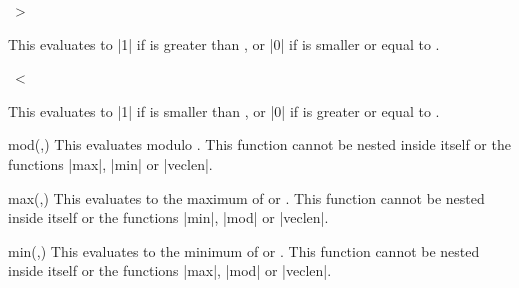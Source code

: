 \begin{math-operator}{\ >\ } 

	This evaluates to |1| if  is greater than , or |0| if 
	 is smaller or equal to .
	
\begin{codeexample}[post=\tt\footnotesize\pgfmathresult]
\end{codeexample}

\end{math-operator}

\begin{math-operator}{\ <\ }

	This evaluates to |1| if  is smaller than , or |0| if
	 is greater or equal to .
	
\begin{codeexample}[post=\tt\footnotesize\pgfmathresult]
\end{codeexample}

\end{math-operator}

\begin{math-function}{mod(,)}
	This evaluates  modulo . This function cannot be 
	nested inside itself or the functions |max|, |min| or |veclen|.

\begin{codeexample}[post=\tt\footnotesize\pgfmathresult]
\end{codeexample}

\end{math-function}

\begin{math-function}{max(,)}
	This evaluates to the maximum of  or . This function 
	cannot be nested inside itself or the functions |min|, |mod| or 
	|veclen|.

\begin{codeexample}[post=\tt\footnotesize\pgfmathresult]
\end{codeexample}

\end{math-function}

\begin{math-function}{min(,)}
	This evaluates to the minimum of  or . This function 
	cannot be nested inside itself or the functions |max|, |mod| or 
	|veclen|.

\begin{codeexample}[post=\tt\footnotesize\pgfmathresult]
\end{codeexample}

\end{math-function}


